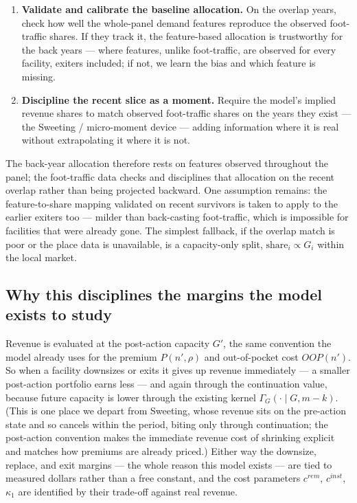 \documentclass[
  letterpaper,
  DIV=11,
  numbers=noendperiod]{scrartcl}
\providecommand{\tightlist}{%
  \setlength{\itemsep}{0pt}\setlength{\parskip}{0pt}}\usepackage{longtable,booktabs,array}
\begin{document}
\begin{enumerate}
\def\labelenumi{\arabic{enumi}.}
\tightlist
\item
  \textbf{Validate and calibrate the baseline allocation.} On the
  overlap years, check how well the whole-panel demand features
  reproduce the observed foot-traffic shares. If they track it, the
  feature-based allocation is trustworthy for the back years --- where
  features, unlike foot-traffic, are observed for every facility,
  exiters included; if not, we learn the bias and which feature is
  missing.
\item
  \textbf{Discipline the recent slice as a moment.} Require the model's
  implied revenue shares to match observed foot-traffic shares on the
  years they exist --- the Sweeting / micro-moment device --- adding
  information where it is real without extrapolating it where it is not.
\end{enumerate}

The back-year allocation therefore rests on features observed throughout
the panel; the foot-traffic data checks and disciplines that allocation
on the recent overlap rather than being projected backward. One
assumption remains: the feature-to-share mapping validated on recent
survivors is taken to apply to the earlier exiters too --- milder than
back-casting foot-traffic, which is impossible for facilities that were
already gone. The simplest fallback, if the overlap match is poor or the
place data is unavailable, is a capacity-only split,
\(\text{share}_i \propto G_i\) within the local market.

\subsection{Why this disciplines the margins the model exists to
study}\label{why-this-disciplines-the-margins-the-model-exists-to-study}

Revenue is evaluated at the post-action capacity \(G'\), the same
convention the model already uses for the premium \(P(n',\rho)\) and
out-of-pocket cost \(OOP(n')\). So when a facility downsizes or exits it
gives up revenue immediately --- a smaller post-action portfolio earns
less --- and again through the continuation value, because future
capacity is lower through the existing kernel
\(\Gamma_G(\cdot \mid G, m-k)\). (This is one place we depart from
Sweeting, whose revenue sits on the pre-action state and so cancels
within the period, biting only through continuation; the post-action
convention makes the immediate revenue cost of shrinking explicit and
matches how premiums are already priced.) Either way the downsize,
replace, and exit margins --- the whole reason this model exists --- are
tied to measured dollars rather than a free constant, and the cost
parameters \(c^{rem}\), \(c^{inst}\), \(\kappa_1\) are identified by
their trade-off against real revenue.
\end{document}

